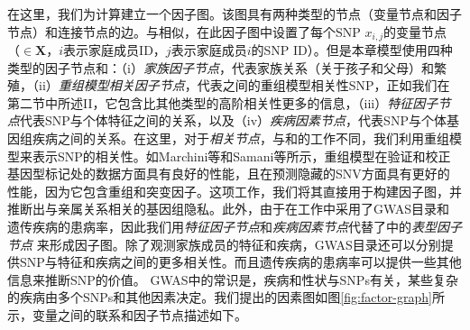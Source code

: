 在这里，我们为计算建立一个因子图。该图具有两种类型的节点（变量节点和因子节点）和连接节点的边。与\cite{humbert2013addressing,humbert2017quantifying,deznabi2018inference}相似，在此因子图中设置了每个SNP $x_{i,j}$的变量节点$（\in \mathbf{X}$，$i$表示家庭成员ID，$j$表示家庭成员$i$的SNP ID）。但是本章模型使用四种类型的因子节点和\cite{deznabi2018inference}：（i）\emph{家族因子节点}，代表家族关系（关于孩子和父母）和繁殖，（ii）\emph{重组模型相关因子节点}，代表之间的重组模型相关性SNP，正如我们在第二节中所述II，它包含比其他类型的高阶相关性更多的信息，（iii）\emph{特征因子节点}代表SNP与个体特征之间的关系，以及（iv）\emph{疾病因素节点}，代表SNP与个体基因组疾病之间的关系。在这里，对于\emph{相关节点}，与\cite{humbert2013addressing}和\cite{deznabi2018inference}的工作不同，我们利用重组模型来表示SNP的相关性。如Marchini等\cite{marchini2007newa}和Samani等\cite{samani2015quantifying}所示，重组模型在验证和校正基因型标记\cite{marchini2007newa}处的数据方面具有良好的性能，且在预测隐藏的SNV方面具有更好的性能，因为它包含重组和突变因子\cite{samani2015quantifying}。这项工作，我们将其直接用于构建因子图，并推断出与亲属关系相关的基因组隐私。此外，由于在工作中采用了GWAS目录和遗传疾病的患病率，因此我们用\emph{特征因子节点}和\emph{疾病因素节点}代替了\cite{deznabi2018inference}中的\emph{表型因子节点} 来形成因子图。除了观测家族成员的特征和疾病，GWAS目录还可以分别提供SNP与特征和疾病之间的更多相关性。而且遗传疾病的患病率可以提供一些其他信息来推断SNP的价值。 GWAS中的常识是，疾病和性状与SNPs\cite{manolio2008a}有关，某些复杂的疾病由多个SNPs和其他因素\cite{climer2014a}决定。我们提出的因素图如图\ref{fig:factor-graph}所示，变量之间的联系和因子节点描述如下。

